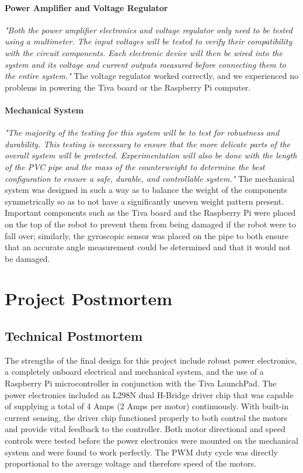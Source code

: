 \documentclass[11pt]{report}
\begin{document}
\begin{spacing}{1.5}
        \paragraph{Power Amplifier and Voltage Regulator} \emph{"Both the power amplifier electronics and voltage regulator only need to be tested using a multimeter. The input voltages will be tested to verify their compatibility with the circuit components. Each electronic device will then be wired into the system and its voltage and current outputs measured before connecting them to the entire system."} The voltage regulator worked correctly, and we experienced no problems in powering the Tiva board or the Raspberry Pi computer.
        
        \paragraph{Mechanical System} \emph{"The majority of the testing for this system will be to test for robustness and durability.  This testing is necessary to ensure that the more delicate parts of the overall system will be protected.  Experimentation will also be done with the length of the PVC pipe and the mass of the counterweight to determine the best configuration to ensure a safe, durable, and controllable system."} The mechanical system was designed in such a way as to balance the weight of the components symmetrically so as to not have a significantly uneven weight pattern present. Important components such as the Tiva board and the Raspberry Pi were placed on the top of the robot to prevent them from being damaged if the robot were to fall over; similarly, the gyroscopic sensor was placed on the pipe to both ensure that an accurate angle measurement could be determined and that it would not be damaged.
        

\section*{Project Postmortem}

    \subsection*{Technical Postmortem}
    
    The strengths of the final design for this project include robust power electronics, a completely onboard electrical and mechanical system, and the use of a Raspberry Pi microcontroller in conjunction with the Tiva LaunchPad. The power electronics included an L298N dual H-Bridge driver chip that was capable of supplying a total of 4 Amps (2 Amps per motor) continuously. With built-in current sensing, the driver chip functioned properly to both control the motors and provide vital feedback to the controller. Both motor directional and speed controls were tested before the power electronics were mounted on the mechanical system and were found to work perfectly. The PWM duty cycle was directly proportional to the average voltage and therefore speed of the motors. 
    

\end{spacing}
\end{document}
